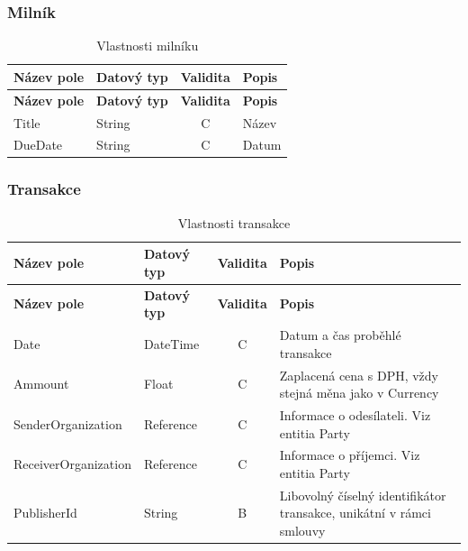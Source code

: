 \subsubsection*{Milník}

\begin{center}
\begin{longtable}{lp{20mm}cp{65mm}}
\label{grid_mlmmh} \\
\multicolumn{1}{l}{\textbf{Název pole}} & 
\multicolumn{1}{l}{\textbf{Datový typ}} & 
\multicolumn{1}{l}{\textbf{Validita}} & 
\multicolumn{1}{l}{\textbf{Popis}} \\ \hline 
\endfirsthead
\multicolumn{1}{l}{\textbf{Název pole}} & 
\multicolumn{1}{l}{\textbf{Datový typ}} & 
\multicolumn{1}{l}{\textbf{Validita}} & 
\multicolumn{1}{l}{\textbf{Popis}} \\ \hline 
\hline
\endhead
\endfoot
\caption{Vlastnosti milníku}
\endlastfoot
\rowcolor{validateC}Title & String & C & Název \\
\rowcolor{validateC}DueDate & String & C & Datum \\
\end{longtable}
\end{center}

\subsubsection*{Transakce}

\begin{center}
\begin{longtable}{lp{20mm}cp{65mm}}
\label{grid_mlmmh} \\
\multicolumn{1}{l}{\textbf{Název pole}} & 
\multicolumn{1}{l}{\textbf{Datový typ}} & 
\multicolumn{1}{l}{\textbf{Validita}} & 
\multicolumn{1}{l}{\textbf{Popis}} \\ \hline 
\endfirsthead
\multicolumn{1}{l}{\textbf{Název pole}} & 
\multicolumn{1}{l}{\textbf{Datový typ}} & 
\multicolumn{1}{l}{\textbf{Validita}} & 
\multicolumn{1}{l}{\textbf{Popis}} \\ \hline 
\hline
\endhead
\endfoot
\caption{Vlastnosti transakce}
\endlastfoot
\rowcolor{validateC}Date & DateTime & C & Datum a čas proběhlé transakce \\
\rowcolor{validateC}Ammount & Float & C & Zaplacená cena s DPH, vždy stejná měna jako v Currency \\
\rowcolor{validateC}SenderOrganization & Reference & C & Informace o odesílateli. Viz entitia Party \\
\rowcolor{validateC}ReceiverOrganization & Reference & C & Informace o příjemci. Viz entitia Party \\
\rowcolor{validateB}PublisherId & String & B & Libovolný číselný identifikátor transakce, unikátní v rámci smlouvy \\
\end{longtable}
\end{center}

